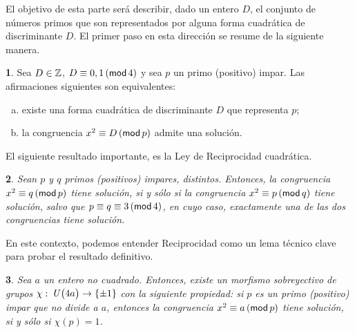 \theoremstyle{plain}
\newtheorem{teoMotivaReciprocidad}{\teoname}[section]
\newtheorem{lemaMotivaReciprocidad}[teoMotivaReciprocidad]{\lemaname}

\theoremstyle{definition}
\newtheorem{obsMotivaReciprocidad}[teoMotivaReciprocidad]{\obsname}


El objetivo de esta parte ser\'a describir, dado un entero $D$,
el conjunto de n\'umeros primos que son representados por alguna
forma cuadr\'atica de discriminante $D$.
El primer paso en esta direcci\'on se resume de la siguiente manera.

\begin{obsMotivaReciprocidad}\label{obs:motiva-reciprocidad}
	Sea $D\in\Enteros$, $D\equiv 0,1\tmodulo[4]$ y sea $p$
	un primo (positivo) impar. Las afirmaciones siguientes
	son equivalentes:
	\begin{enumerate}[(a)]
		\item\label{item:motiva-reciprocidad:representado}
			existe una forma cuadr\'atica de discriminante
			$D$ que representa $p$;
		\item\label{item:motiva-reciprocidad:residuo}
			la congruencia $x^2\equiv D\tmodulo[p]$ admite
			una soluci\'on.
	\end{enumerate}
\end{obsMotivaReciprocidad}

El siguiente resultado importante, es la Ley de Reciprocidad
cuadr\'atica.

\begin{lemaMotivaReciprocidad}\label{lema:motiva-reciprocidad}
	Sean $p$ y $q$ primos (positivos) impares, distintos.
	Entonces, la congruencia $x^2\equiv q\tmodulo[p]$
	tiene soluci\'on, si y s\'olo si la congruencia
	$x^2\equiv p\tmodulo[q]$ tiene soluci\'on,
	salvo que $p\equiv q\equiv 3\tmodulo[4]$, en cuyo
	caso, exactamente una de las dos congruencias
	tiene soluci\'on.
\end{lemaMotivaReciprocidad}

En este contexto, podemos entender Reciprocidad como un lema
t\'ecnico clave para probar el resultado definitivo.

\begin{teoMotivaReciprocidad}\label{teo:motiva-reciprocidad}
	Sea $a$ un entero no cuadrado. Entonces, existe un
	morfismo sobreyectivo de grupos
	$\chi:\,\Unidadesmod[4a]\rightarrow\{\pm 1\}$ con la
	siguiente propiedad:
	si $p$ es un primo (positivo) impar que no divide a $a$,
	entonces la congruencia $x^2\equiv a\tmodulo[p]$ tiene
	soluci\'on, si y s\'olo si $\chi(p)=1$.
\end{teoMotivaReciprocidad}

